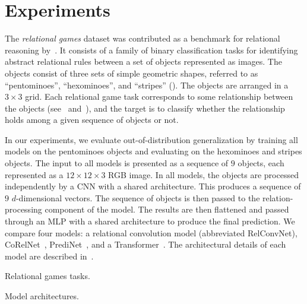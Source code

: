 \section{Experiments}\label{sec:experiments}

The \textit{relational games} dataset was contributed as a benchmark for relational reasoning by~\citep{shanahanExplicitlyRelationalNeural}. It consists of a family of binary classification tasks for identifying abstract relational rules between a set of objects represented as images. The objects consist of three sets of simple geometric shapes, referred to as ``pentominoes'', ``hexominoes'', and ``stripes'' (). The objects are arranged in a $3 \times 3$ grid. Each relational game task corresponds to some relationship between the objects (see~ and~), and the target is to classify whether the relationship holds among a given sequence of objects or not.

In our experiments, we evaluate out-of-distribution generalization by training all models on the pentominoes objects and evaluating on the hexominoes and stripes objects. The input to all models is presented as a sequence of $9$ objects, each represented as a $12 \times 12 \times 3$ RGB image. In all models, the objects are processed independently by a CNN with a shared architecture. This produces a sequence of $9$ $d$-dimensional vectors. The sequence of objects is then passed to the relation-processing component of the model. The results are then flattened and passed through an MLP with a shared architecture to produce the final prediction. We compare four models: a relational convolution model (abbreviated RelConvNet), CoRelNet~\citep{kergNeuralArchitecture2022}, PrediNet~\citep{shanahanExplicitlyRelationalNeural}, and a Transformer~\citep{vaswani2017attention}. The architectural details of each model are described in~.

\begin{table}[ht]
    \centering
    
    \caption{Relational games tasks.}
    \label{tab:relational_games_tasks}
\end{table}

\begin{table}[ht]
    \centering
    
    \caption{Model architectures.}
    \label{tab:architectures}
\end{table}

